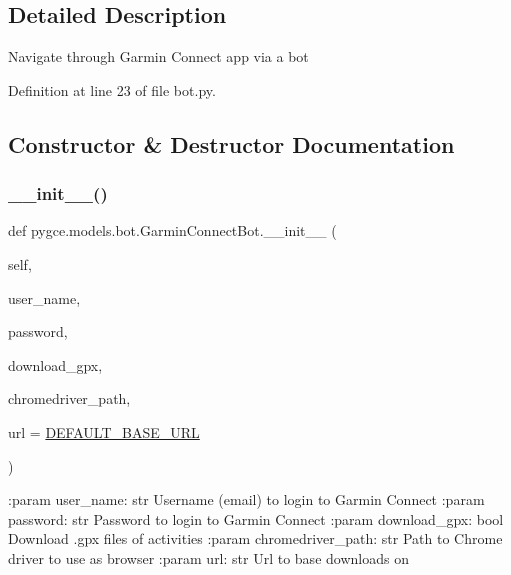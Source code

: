 \subsection{Detailed Description}
\begin{DoxyVerb}Navigate through Garmin Connect app via a bot \end{DoxyVerb}
 

Definition at line 23 of file bot.\+py.



\subsection{Constructor \& Destructor Documentation}
\mbox{\label{classpygce_1_1models_1_1bot_1_1_garmin_connect_bot_aeb909c53e6a647b5e8419d4877ba5b6d}} 
\subsubsection{\texorpdfstring{\+\_\+\+\_\+init\+\_\+\+\_\+()}{\_\_init\_\_()}}
{\footnotesize\ttfamily def pygce.\+models.\+bot.\+Garmin\+Connect\+Bot.\+\_\+\+\_\+init\+\_\+\+\_\+ (\begin{DoxyParamCaption}\item[{}]{self,  }\item[{}]{user\+\_\+name,  }\item[{}]{password,  }\item[{}]{download\+\_\+gpx,  }\item[{}]{chromedriver\+\_\+path,  }\item[{}]{url = {\ttfamily \hyperlink{classpygce_1_1models_1_1bot_1_1_garmin_connect_bot_a860621296516b8e3793321d0773e30f3}{D\+E\+F\+A\+U\+L\+T\+\_\+\+B\+A\+S\+E\+\_\+\+U\+RL}} }\end{DoxyParamCaption})}

\begin{DoxyVerb}:param user_name: str
    Username (email) to login to Garmin Connect
:param password: str
    Password to login to Garmin Connect
:param download_gpx: bool
    Download .gpx files of activities
:param chromedriver_path: str
    Path to Chrome driver to use as browser
:param url: str
    Url to base downloads on
\end{DoxyVerb}
 

